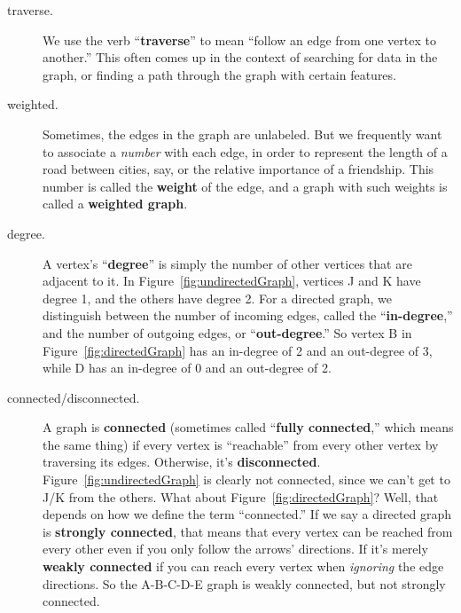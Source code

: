 \begin{description}

\item[traverse.] We use the verb ``\textbf{traverse}'' to mean ``follow an edge
from one vertex to another.'' This often comes up in the context of searching
for data in the graph, or finding a path through the graph with certain
features.


\item [weighted.] Sometimes, the edges in the graph are unlabeled. But we
frequently want to associate a \textit{number} with each edge, in order to
represent the length of a road between cities, say, or the relative importance
of a friendship. This number is called the \textbf{weight} of the edge, and a
graph with such weights is called a \textbf{weighted graph}.


\item [degree.] A vertex's ``\textbf{degree}'' is simply the number of other
vertices that are adjacent to it. In Figure~\ref{fig:undirectedGraph}, vertices J
and K have degree 1, and the others have degree 2. For a directed graph, we
distinguish between the number of incoming edges, called the
``\textbf{in-degree},'' and the number of outgoing edges, or
``\textbf{out-degree}.'' So vertex B in Figure~\ref{fig:directedGraph} has an
in-degree of 2 and an out-degree of 3, while D has an in-degree of 0 and an
out-degree of 2.


\item[connected/disconnected.] A graph is \textbf{connected} (sometimes called
``\textbf{fully connected},'' which means the same thing) if every vertex is
``reachable'' from every other vertex by traversing its edges. Otherwise, it's
\textbf{disconnected}. Figure~\ref{fig:undirectedGraph} is clearly not
connected, since we can't get to J/K from the others. What about
Figure~\ref{fig:directedGraph}? Well, that depends on how we define the term
``connected.'' If we say a directed graph is \textbf{strongly connected}, that
means that every vertex can be reached from every other even if you only follow
the arrows' directions. If it's merely \textbf{weakly connected} if you can
reach every vertex when \textit{ignoring} the edge directions. So the A-B-C-D-E
graph is weakly connected, but not strongly connected.


\end{description}
